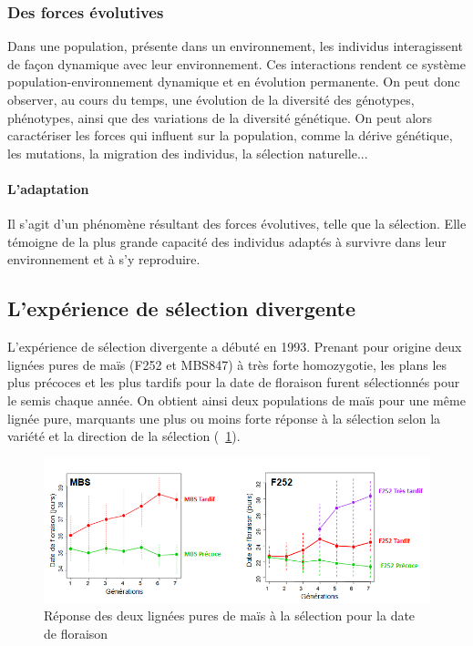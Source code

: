 \documentclass[12pt,a4paper]{report}
\begin{document}
				\subsubsection{Des forces évolutives}
				
					Dans une population, présente dans un environnement, les individus interagissent de façon dynamique avec leur environnement. Ces interactions rendent ce système population-environnement dynamique et en évolution permanente. On peut donc observer, au cours du temps, une évolution de la diversité des génotypes, phénotypes, ainsi que des variations de la diversité génétique. On peut alors caractériser les forces qui influent sur la population, comme la dérive génétique, les mutations, la migration des individus, la sélection naturelle... %
					
				\paragraph{L'adaptation}
				
					Il s'agit d'un phénomène résultant des forces évolutives, telle que la sélection. Elle témoigne de la plus grande capacité des individus adaptés à survivre dans leur environnement et à s'y reproduire.
			
			\subsection{L'expérience de sélection divergente}
			
				L'expérience de sélection divergente a débuté en 1993. Prenant pour origine deux lignées pures de maïs (F252 et MBS847) à très forte homozygotie, les plans les plus précoces et les plus tardifs pour la date de floraison furent sélectionnés pour le semis chaque année. On obtient ainsi deux populations de maïs pour une même lignée pure, marquants une plus ou moins forte réponse à la sélection selon la variété et la direction de la sélection (~\ref{sélection}).
				\begin{figure}
					\centering
					\includegraphics[width = 13.7 cm]{selection.png}
					\caption{Réponse des deux lignées pures de maïs à la sélection pour la date de floraison}
					\label{sélection}
				\end{figure}
				
\end{document}
